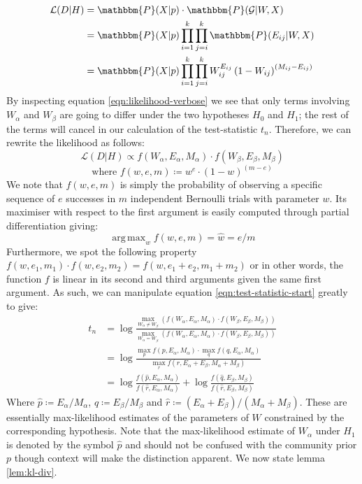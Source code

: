\documentclass[11pt]{article}
\DeclareMathOperator*{\argmax}{arg\,max}
\newcommand{\Gcal}{\mathcal{G}}
\newcommand{\lik}{\mathcal{L}}
\newcommand{\prob}{\mathbbm{P}}
\begin{document}
\begin{multicols*}{2}
%
\begin{align}
\lik(D | H) &= \prob(X| p) \cdot \prob(\Gcal | W, X) \nonumber \\
&= \prob(X | p) \prod_{i=1}^{k} \prod_{j=i}^{k} \prob(E_{ij} | W, X) \nonumber \\
&= \prob(X | p) \prod_{i=1}^{k} \prod_{j=i}^{k} W_{ij} ^ {E_{ij}} \left( 1 - W_{ij} \right) ^ {(M_{ij} - E_{ij})}
\label{eqn:likelihood-verbose}
\end{align}
%
By inspecting equation \ref{eqn:likelihood-verbose} we see that only terms involving $W_{\alpha}$ and $W_{\beta}$ are going to differ under the two hypotheses $H_0$ and $H_1$; the rest of the terms will cancel in our calculation of the test-statistic $t_n$. Therefore, we can rewrite the likelihood as follows:
%
\begin{equation}
	\lik (D | H) \propto f (W_\alpha, E_\alpha, M_\alpha) \cdot f (W_\beta, E_\beta, M_\beta)
\end{equation} 
\begin{equation}
	\textrm{where } f (w, e, m) \coloneqq w^e \cdot (1-w)^{(m - e)}
	\label{eqn:f-defn}
\end{equation}
%
We note that $f(w, e, m)$ is simply the probability of observing a specific sequence of $e$ successes in $m$ independent Bernoulli trials with parameter $w$. Its maximiser with respect to the first argument is easily computed through partial differentiation giving:
%
\begin{equation}
	\argmax_w f(w, e, m) = \hat{w} = e / m
	\label{eqn:f-maximiser}
\end{equation}
%
Furthermore, we spot the following property $f(w, e_1, m_1) \cdot f(w, e_2, m_2) = f(w, e_1 + e_2, m_1 + m_2)$ or in other words, the function $f$ is linear in its second and third arguments given the same first argument. As such, we can manipulate equation \ref{eqn:test-statistic-start} greatly to give:
%
\begin{align}
	t_n &= \log \frac
	{
		\max_{W_{\alpha} \neq W_{\beta}}(f (W_\alpha, E_\alpha, M_\alpha) \cdot f (W_\beta, E_\beta, M_\beta))
	}
	{
		\max_{W_\alpha = W_\beta} (f (W_\alpha, E_\alpha, M_\alpha) \cdot f (W_\beta, E_\beta, M_\beta))
	} \nonumber \\
	&= \log \frac{
		\max_p f(p, E_\alpha, M_\alpha) \cdot \max_q f(q, E_\alpha, M_\alpha)
	}{
		\max_r f(r, E_\alpha + E_\beta, M_\alpha + M_\beta)
	} \nonumber \\
	&= \log \frac{f(\hat{p}, E_\alpha, M_\alpha)}{f(\hat{r}, E_\alpha, M_\alpha)} + \log \frac{f(\hat{q}, E_\beta, M_\beta)}{f(\hat{r}, E_\beta, M_\beta)}
\end{align}
%
Where $\hat{p} \coloneqq E_\alpha / M_\alpha$, $\hat{q} \coloneqq E_\beta / M_\beta$ and $\hat{r} \coloneqq (E_\alpha + E_\beta) / (M_\alpha + M_\beta)$. These are essentially max-likelihood estimates of the parameters of $W$ constrained by the corresponding hypothesis. Note that the max-likelihood estimate of $W_\alpha$ under $H_1$ is denoted by the symbol $\hat{p}$ and should not be confused with the community prior $p$ though context will make the distinction apparent. We now state lemma \ref{lem:kl-div}.


\end{multicols*}
\end{document}
